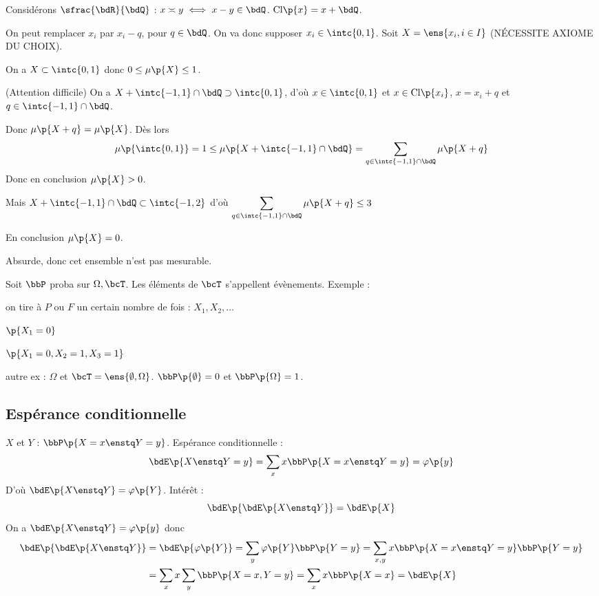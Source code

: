 \documentclass[a4paper,french,bookmarks]{book}
\begin{document}
    Considérons $\sfrac{\bdR}{\bdQ}$ : $x \asymp y \iff x - y \in \bdQ$. $\mathrm{Cl}\p{x} = x + \bdQ$.
    
    On peut remplacer $x_i$ par $x_i - q$, pour $q \in \bdQ$. On va donc supposer $x_i \in \intc{0, 1}$. Soit $X = \ens{x_i, i \in I}$ (NÉCESSITE AXIOME DU CHOIX).
    
    On a $X \subset \intc{0, 1}$ donc $0 \leq \mu\p{X} \leq 1$.
    
    \begin{enumerate}
        \itt (Attention difficile) On a $X + \intc{-1, 1} \cap \bdQ \supset \intc{0, 1}$, d'où $x \in \intc{0, 1}$ et $x \in \mathrm{Cl}\p{x_i}$, \ie $x = x_i + q$ et $q \in \intc{-1, 1} \cap \bdQ$.
        
        Donc $\mu\p{X + q} = \mu\p{X}$. Dès lors
        \[ \mu\p{\intc{0, 1}} = 1 \leq \mu\p{X + \intc{-1, 1} \cap \bdQ} = \sum_{q \in \intc{-1, 1} \cap \bdQ} \mu\p{X + q}\]
        Donc en conclusion $\mu\p{X} > 0$.
        
        \itt Mais $X + \intc{-1, 1} \cap \bdQ \subset \intc{-1, 2}$ d'où $\displaystyle\sum_{q \in \intc{-1, 1} \cap \bdQ} \mu\p{X + q} \leq 3$
        
        En conclusion $\mu\p{X} = 0$.
    \end{enumerate}
    
    Absurde, donc cet ensemble n'est pas mesurable.\bigskip\bigskip
    
    Soit $\bbP$ proba sur $\Omega, \bcT$. Les éléments de $\bcT$ s'appellent évènements. Exemple :
    \begin{enumerate}
        \itt on tire à $P$ ou $F$ un certain nombre de fois : $X_1, X_2, \dots$
        
        \itt $\p{X_1 = 0}$
        
        \itt $\p{X_1 = 0, X_2 = 1, X_3 = 1}$
        
        \itt autre ex : $\Omega$ et $\bcT = \ens{\emptyset, \Omega}$. $\bbP\p{\emptyset} = 0$ et $\bbP\p{\Omega} = 1$.
    \end{enumerate}
    
    \subsection{Espérance conditionnelle}
    
    $X$ et $Y$ : $\bbP\p{X = x \enstq Y = y}$. Espérance conditionnelle :
    \[ \bdE\p{X \enstq Y = y} = \sum_x x\bbP\p{X = x \enstq Y = y} = \varphi\p{y}\]
    D'où $\bdE\p{X \enstq Y} = \varphi\p{Y}$. Intérêt :
    \[ \bdE\p{\bdE\p{X \enstq Y}} = \bdE\p{X}\]
    On a  $\bdE\p{X \enstq Y} = \varphi\p{y}$ donc
    \begin{align*}
        \bdE\p{\bdE\p{X \enstq Y}} &= \bdE\p{\varphi\p{Y}} = \sum_y \varphi\p{Y}\bbP\p{Y = y} = \sum_{x, y}x\bbP\p{X = x \enstq Y = y}\bbP\p{Y = y}\\
        &= \sum_x x \sum_y \bbP\p{X = x, Y = y} = \sum_x x \bbP\p{X = x} = \bdE\p{X}
    \end{align*}
    
\end{document}
